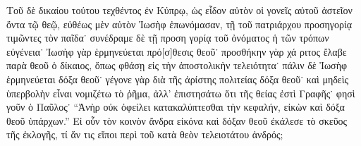 Τοῦ δὲ δικαίου τούτου τεχθέντος ἐν Κύπρῳ, ὡς εἶδον
αὐτὸν οἱ γονεῖς αὐτοῦ ἀστεῖον ὄντα τῷ θεῷ, εὐθέως
μὲν αὐτὸν Ἰωσὴφ ἐπωνόμασαν, τῇ τοῦ πατριάρχου
προσηγορίᾳ τιμῶντες τὸν παῖδα˙ συνέδραμε δὲ τῇ προση%
γορίᾳ τοῦ ὀνόματος ἡ τῶν τρόπων εὐγένεια˙ Ἰωσὴφ
γὰρ ἑρμηνεύεται πρό[σ]θεσις θεοῦ˙ προσθήκην γὰρ χά%
ριτος ἔλαβε παρὰ θεοῦ ὁ δίκαιος, ὅπως φθάσῃ εἰς τὴν
ἀποστολικὴν τελειότητα˙ πάλιν δὲ Ἰωσὴφ ἑρμηνεύεται
δόξα θεοῦ˙ γέγονε γὰρ διὰ τῆς ἀρίστης πολιτείας δόξα
θεοῦ˙ καὶ μηδεὶς ὑπερβολὴν εἶναι νομιζέτω τὸ ῥῆμα,
ἀλλ’ ἐπιστησάτω ὅτι τῆς θείας ἐστὶ Γραφῆς˙ φησὶ γοῦν
ὁ Παῦλος˙ \enquote{Ἀνὴρ οὐκ ὀφείλει κατακαλύπτεσθαι τὴν
κεφαλήν, εἰκὼν καὶ δόξα θεοῦ ὑπάρχων.} Εἰ οὖν τὸν
κοινὸν ἄνδρα εἰκόνα καὶ δόξαν θεοῦ ἐκάλεσε τὸ σκεῦος
τῆς ἐκλογῆς, τί ἄν τις εἴποι περὶ τοῦ κατὰ θεὸν
τελειοτάτου ἀνδρός;
%

